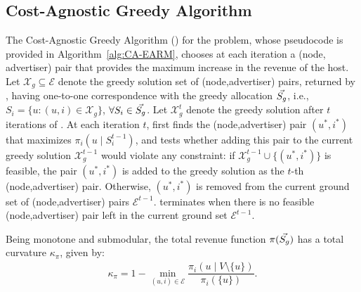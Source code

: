 \subsection{Cost-Agnostic Greedy Algorithm}
The Cost-Agnostic Greedy Algorithm (\CARM) for the \RM problem, whose pseudocode is provided in Algorithm~\ref{alg:CA-EARM}, chooses at each iteration a (node, advertiser) pair that provides the maximum increase in the revenue of the host.
Let $\mathcal{X}_g \subseteq \mathcal{E}$ denote the greedy solution set of (node,advertiser) pairs, returned by \CARM,  having one-to-one correspondence with the greedy allocation $\vec{S_g}$, i.e., $S_i = \{u : (u,i) \in \mathcal{X}_g \}$, $\forall S_i \in \vec{S_g}$. Let $\mathcal{X}_g^t$ denote the greedy solution after $t$ iterations of \CARM. At each iteration $t$, \CARM first finds the (node,advertiser) pair $(u^*,i^*)$ that maximizes  $\pi_i(u \mid S^{t-1}_i)$, and tests whether adding this pair to the current greedy solution $\mathcal{X}_g^{t-1}$ would violate any constraint: if $\mathcal{X}_g^{t-1} \cup \{(u^*,i^*)\}$ is feasible, the pair $(u^*,i^*)$ is added to the greedy solution as the $t$-th (node,advertiser) pair. Otherwise, $(u^*,i^*)$ is removed from the current ground set of (node,advertiser) pairs $\mathcal{E}^{t-1}$. \CARM terminates when there is no feasible (node,advertiser) pair left in the current ground set $\mathcal{E}^{t-1}$.

\begin{observation}\label{obs:curvatureTotalPi}
Being monotone and submodular, the total revenue function $\pi(\vec{S_g})$ has a total curvature $\kappa_{\pi}$, given by: %
\begin{align*}
\kappa_{\pi} = 1 - \underset{(u,i) \in \mathcal{E}} {\min} \dfrac{\pi_i(u \mid V \setminus\{u\})}{\pi_i(\{u\})}.
\end{align*}
\end{observation}

